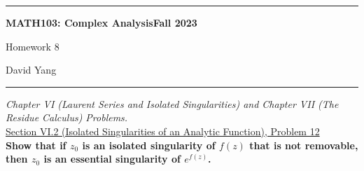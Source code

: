 \documentclass[11pt]{article}
\theoremstyle{definition}
\begin{document}
	\hrule
	\begin{center}
        \textbf{MATH103: Complex Analysis}\hfill \textbf{Fall 2023}\newline


		{\Large Homework 8}

		David Yang
	\end{center}

\hrule

\vspace{1em}


\textit{Chapter VI (Laurent Series and Isolated Singularities) and Chapter VII (The Residue Calculus) Problems.} \\

\underline{Section VI.2 (Isolated Singularities of an Analytic Function), Problem 12}\\

\textbf{Show that if $z_0$ is an isolated singularity of $f(z)$ that is not removable, then $z_0$ is an essential singularity of $e^{f(z)}$.}
\end{document}
